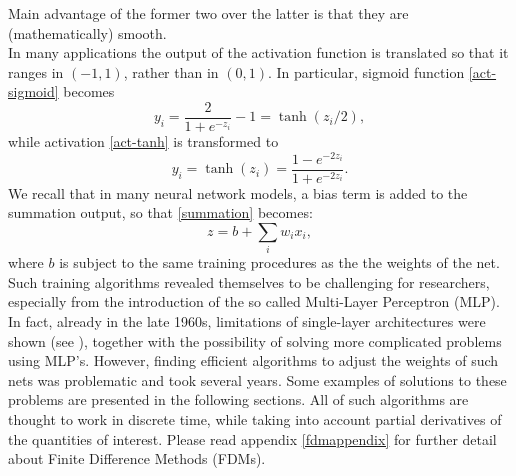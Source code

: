 \documentclass[%
    corpo=11pt,
    twoside,
    stile=classica,
    oldstyle,
    autoretitolo,
    tipotesi=magistrale,
    greek,
    evenboxes,
    english
]{toptesi}
\begin{document}
Main advantage of the former two over the latter is that they are (mathematically) smooth. \\
In many applications the output of the activation function is translated so that it ranges in $\left(-1, 1\right)$, rather than in $\left(0, 1 \right)$. In particular, sigmoid function \eqref{act-sigmoid} becomes 
\begin{equation}
y_i = \frac{2}{1 + e^{-z_i}} -1 = \tanh(z_i/2),
\end{equation}
while activation \eqref{act-tanh} is transformed to 
\begin{equation}
y_i = \tanh(z_i) = \frac{1 - e^{-2z_i}}{1 + e^{-2z_i}}.
\end{equation}
We recall that in many neural network models, a bias term is added to the summation output, so that \eqref{summation} becomes:
\begin{equation}
z = b + \sum_{i}w_i x_i,
\end{equation}
where $b$ is subject to the same training procedures as the the weights of the net. \\ Such training algorithms revealed themselves to be challenging for researchers, especially from the introduction of the so called Multi-Layer Perceptron (MLP). In fact, already in the late 1960s, limitations of single-layer architectures were shown (see \cite{minpapert}), together with the possibility of solving more complicated problems using MLP's. However, finding efficient algorithms to adjust the weights of such nets was problematic and took several years. Some examples of solutions to these problems are presented in the following sections. All of such algorithms are thought to work in discrete time, while taking into account partial derivatives of the quantities of interest. Please read appendix \ref{fdmappendix} for further detail about Finite Difference Methods (FDMs).
\end{document}
